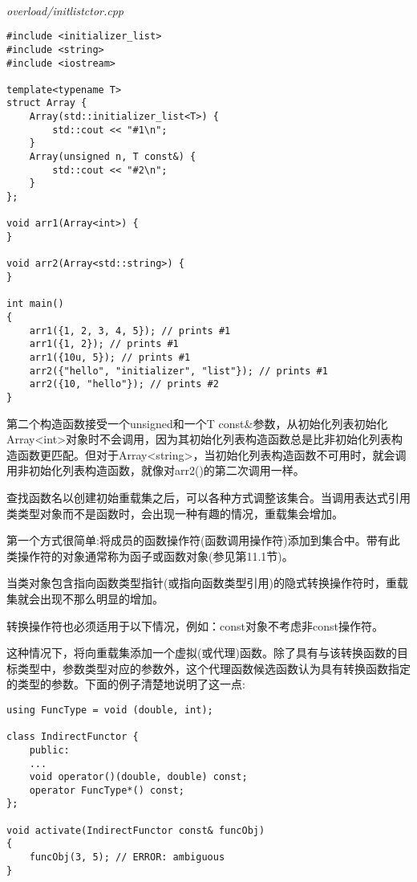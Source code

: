 \hspace*{\fill} \\ %
\noindent
\textit{overload/initlistctor.cpp}
\begin{lstlisting}[style=styleCXX]
#include <initializer_list>
#include <string>
#include <iostream>

template<typename T>
struct Array {
	Array(std::initializer_list<T>) {
		std::cout << "#1\n";
	}
	Array(unsigned n, T const&) {
		std::cout << "#2\n";
	}
};

void arr1(Array<int>) {
}

void arr2(Array<std::string>) {
}

int main()
{
	arr1({1, 2, 3, 4, 5}); // prints #1
	arr1({1, 2}); // prints #1
	arr1({10u, 5}); // prints #1
	arr2({"hello", "initializer", "list"}); // prints #1
	arr2({10, "hello"}); // prints #2
}
\end{lstlisting}

第二个构造函数接受一个unsigned和一个T const\&参数，从初始化列表初始化Array<int>对象时不会调用，因为其初始化列表构造函数总是比非初始化列表构造函数更匹配。但对于Array<string>，当初始化列表构造函数不可用时，就会调用非初始化列表构造函数，就像对arr2()的第二次调用一样。


查找函数名以创建初始重载集之后，可以各种方式调整该集合。当调用表达式引用类类型对象而不是函数时，会出现一种有趣的情况，重载集会增加。

第一个方式很简单:将成员的函数操作符(函数调用操作符)添加到集合中。带有此类操作符的对象通常称为函子或函数对象(参见第11.1节)。

当类对象包含指向函数类型指针(或指向函数类型引用)的隐式转换操作符时，重载集就会出现不那么明显的增加。

\begin{tcolorbox}[colback=webgreen!5!white,colframe=webgreen!75!black]
\hspace*{0.75cm}转换操作符也必须适用于以下情况，例如：const对象不考虑非const操作符。
\end{tcolorbox}

这种情况下，将向重载集添加一个虚拟(或代理)函数。除了具有与该转换函数的目标类型中，参数类型对应的参数外，这个代理函数候选函数认为具有转换函数指定的类型的参数。下面的例子清楚地说明了这一点:

\begin{lstlisting}[style=styleCXX]
using FuncType = void (double, int);

class IndirectFunctor {
	public:
	...
	void operator()(double, double) const;
	operator FuncType*() const;
};

void activate(IndirectFunctor const& funcObj)
{
	funcObj(3, 5); // ERROR: ambiguous
}
\end{lstlisting}

